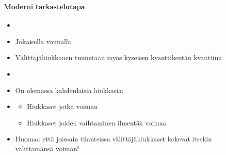 \xdef\sectiontitle{\IVaSubsectiontitle} 

\begin{frame}
\frametitle{\texorpdfstring{\culine[\sectiontitleulinecolor]{\sectiontitle}}{\sectiontitle} }
\framesubtitle{Moderni tarkastelutapa}
\appear{}

\begin{itemize}
	 \item {}
\item Jokaisella voimalla  
\item Välittäjähiukkanen tunnetaan myös kyseisen kvanttikentän kvanttina

\item {}

\item On olemassa kahdenlaisia hiukkasia:
\item[] \begin{itemize}
	\item Hiukkaset jotka  voiman
\item Hiukkaset joiden vaihtaminen ilmentää voimaa %

\end{itemize}

\item Huomaa että joissain tilanteissa välittäjähiukkaset kokevat itsekin välittämänsä voiman!
\end{itemize}

\endofslide 
\end{frame}


